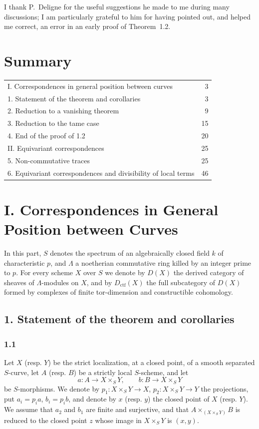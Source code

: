 \documentclass[11pt]{article}
\providecommand{\ctf}{\mathrm{ctf}}
\begin{document}
I thank P.~Deligne for the useful suggestions he made to me during many discussions; I am particularly grateful to him for having pointed out, and helped me correct, an error in an early proof of Theorem~1.2.

\section*{Summary}
\begin{tabular}{@{}p{}r@{}}
I. Correspondences in general position between curves & 3\\
1. Statement of the theorem and corollaries & 3\\
2. Reduction to a vanishing theorem & 9\\
3. Reduction to the tame case & 15\\
4. End of the proof of 1.2 & 20\\
II. Equivariant correspondences & 25\\
5. Non-commutative traces & 25\\
6. Equivariant correspondences and divisibility of local terms & 46
\end{tabular}

\section*{I. Correspondences in General Position between Curves}

In this part, $S$ denotes the spectrum of an algebraically closed field $k$ of characteristic $p$, and $\Lambda$ a noetherian commutative ring killed by an integer prime to $p$. For every scheme $X$ over $S$ we denote by $D(X)$ the derived category of sheaves of $\Lambda$-modules on $X$, and by $D_{\ctf}(X)$ the full subcategory of $D(X)$ formed by complexes of finite tor-dimension and constructible cohomology.

\subsection*{1. Statement of the theorem and corollaries}

\subsubsection*{1.1}
Let $X$ (resp. $Y$) be the strict localization, at a closed point, of a smooth separated $S$-curve, let $A$ (resp. $B$) be a strictly local $S$-scheme, and let
\[
a:A\longrightarrow X\times_S Y,
\qquad
b:B\longrightarrow X\times_S Y
\]
be $S$-morphisms. We denote by $p_1:X\times_S Y\to X$, $p_2:X\times_S Y\to Y$ the projections, put $a_i=p_i a$, $b_i=p_i b$, and denote by $x$ (resp. $y$) the closed point of $X$ (resp. $Y$). We assume that $a_2$ and $b_1$ are finite and surjective, and that $A\times_{(X\times_S Y)}B$ is reduced to the closed point $z$ whose image in $X\times_S Y$ is $(x,y)$.
\end{document}
